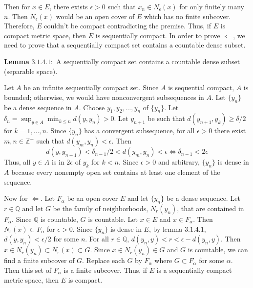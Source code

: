 \begin{exercise}
  Then for \(x\in E\), there exists \(\epsilon > 0\) such that
  \(x_n\in N_{\epsilon}(x)\) for only finitely many \(n\).
  Then \(N_{\epsilon}(x)\) would be an open cover of \(E\) which has no finite
  subcover.
  Therefore, \(E\) couldn't be compact contradicting the premise.
  Thus, if \(E\) is compact metric space, then \(E\) is sequentially compact.
  In order to prove \(\Leftarrow\), we need to prove that a sequentially
  compact set contains a countable dense subset.
  \par\smallskip
  \textbf{Lemma} \(\mathbold{3.1.4.1:}\) A sequentially compact set contains
  a countable dense subset (separable space).
  \par\smallskip
  Let \(A\) be an infinite sequentially compact set.
  Since \(A\) is sequential compact, \(A\) is bounded; otherwise, we would have
  nonconvergent subsequences in \(A\).
  Let \(\{y_n\}\) be a dense sequence in \(A\).
  Choose \(y_1,y_2,\ldots,y_n\) of \(\{y_n\}\).
  Let \(\delta_n = \sup_{y\in A}\min_{k\leq n}d(y,y_n) > 0\).
  Let \(y_{n + 1}\) be such that \(d(y_{n + 1},y_k)\geq\delta/2\) for
  \(k = 1,\ldots,n\).
  Since \(\{y_n\}\) has a convergent subsequence, for all \(\epsilon > 0\)
  there exist \(m,n\in\mathbb{Z}^+\) such that \(d(y_m,y_n) < \epsilon\).
  Then
  \[
    d(y,y_{n - 1}) < \delta_{n - 1}/2 < d(y_m,y_n) < \epsilon\iff
    \delta_{n - 1} < 2\epsilon
  \]
  Thus, all \(y\in A\) is in \(2\epsilon\) of \(y_k\) for \(k < n\).
  Since \(\epsilon > 0\) and arbitrary, \(\{y_n\}\) is dense in \(A\) because
  every nonempty open set contains at least one element of the sequence.
  \par\smallskip
  Now for \(\Leftarrow\).
  Let \(F_{\alpha}\) be an open cover \(E\) and let \(\{y_n\}\) be a dense
  sequence.
  Let \(r\in\mathbb{Q}\) and let \(G\) be the family of neighborhoods,
  \(N_r(y_n)\), that are contained in \(F_{\alpha}\).
  Since \(\mathbb{Q}\) is countable, \(G\) is countable.
  Let \(x\in E\) and \(x\in F_{\alpha}\).
  Then \(N_{\epsilon}(x)\subset F_{\alpha}\) for \(\epsilon > 0\).
  Since \(\{y_n\}\) is dense in \(E\), by lemma \(3.1.4.1\),
  \(d(y,y_n) < \epsilon/2\) for some \(n\).
  For all \(r\in\mathbb{Q}\), \(d(y_n,y) < r < \epsilon - d(y_n,y)\).
  Then \(x\in N_r(y_n)\subset N_{\epsilon}(x)\subset G\).
  Since \(x\in N_r(y_n)\in G\) and \(G\) is countable, we can find a finite
  subcover of \(G\).
  Replace each \(G\) by \(F_{\alpha}\) where \(G\subset F_{\alpha}\) for some
  \(\alpha\).
  Then this set of \(F_{\alpha}\) is a finite subcover.
  Thus, if \(E\) is a sequentially compact metric space, then \(E\) is compact.

\end{exercise}
